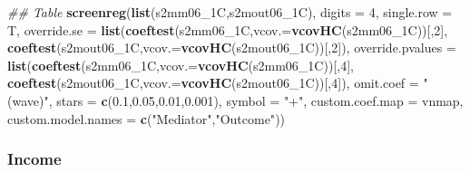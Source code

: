 \documentclass[
]{article}
\newenvironment{Shaded}{\begin{snugshade}}{\end{snugshade}}
\newcommand{\CommentTok}[1]{\textcolor[rgb]{0.56,0.35,0.01}{\textit{#1}}}
\newcommand{\DataTypeTok}[1]{\textcolor[rgb]{0.13,0.29,0.53}{#1}}
\newcommand{\DecValTok}[1]{\textcolor[rgb]{0.00,0.00,0.81}{#1}}
\newcommand{\FloatTok}[1]{\textcolor[rgb]{0.00,0.00,0.81}{#1}}
\newcommand{\KeywordTok}[1]{\textcolor[rgb]{0.13,0.29,0.53}{\textbf{#1}}}
\newcommand{\NormalTok}[1]{#1}
\newcommand{\StringTok}[1]{\textcolor[rgb]{0.31,0.60,0.02}{#1}}
\begin{document}
\begin{Shaded}
\begin{Highlighting}[]
\CommentTok{## Table}
\KeywordTok{screenreg}\NormalTok{(}\KeywordTok{list}\NormalTok{(s2mm06_1C,s2mout06_1C), }\DataTypeTok{digits =} \DecValTok{4}\NormalTok{, }\DataTypeTok{single.row =}\NormalTok{ T,}
          \DataTypeTok{override.se =} \KeywordTok{list}\NormalTok{(}\KeywordTok{coeftest}\NormalTok{(s2mm06_1C,}\DataTypeTok{vcov.=}\KeywordTok{vcovHC}\NormalTok{(s2mm06_1C))[,}\DecValTok{2}\NormalTok{],}
                             \KeywordTok{coeftest}\NormalTok{(s2mout06_1C,}\DataTypeTok{vcov.=}\KeywordTok{vcovHC}\NormalTok{(s2mout06_1C))[,}\DecValTok{2}\NormalTok{]),}
          \DataTypeTok{override.pvalues =} \KeywordTok{list}\NormalTok{(}\KeywordTok{coeftest}\NormalTok{(s2mm06_1C,}\DataTypeTok{vcov.=}\KeywordTok{vcovHC}\NormalTok{(s2mm06_1C))[,}\DecValTok{4}\NormalTok{],}
                                  \KeywordTok{coeftest}\NormalTok{(s2mout06_1C,}\DataTypeTok{vcov.=}\KeywordTok{vcovHC}\NormalTok{(s2mout06_1C))[,}\DecValTok{4}\NormalTok{]),}
          \DataTypeTok{omit.coef =} \StringTok{"(wave)"}\NormalTok{, }\DataTypeTok{stars =} \KeywordTok{c}\NormalTok{(}\FloatTok{0.1}\NormalTok{,}\FloatTok{0.05}\NormalTok{,}\FloatTok{0.01}\NormalTok{,}\FloatTok{0.001}\NormalTok{), }\DataTypeTok{symbol =} \StringTok{"+"}\NormalTok{,}
          \DataTypeTok{custom.coef.map =}\NormalTok{ vnmap, }
          \DataTypeTok{custom.model.names =} \KeywordTok{c}\NormalTok{(}\StringTok{"Mediator"}\NormalTok{,}\StringTok{"Outcome"}\NormalTok{))}
\end{Highlighting}
\end{Shaded}

\hypertarget{income}{%
\subsubsection{Income}\label{income}}
\end{document}
